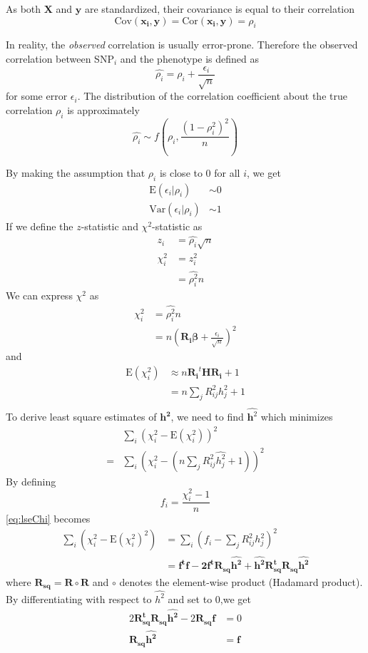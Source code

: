 \documentclass[12pt]{scrbook}
\begin{document}
As both $\boldsymbol{X}$ and $\boldsymbol{y}$ are standardized, their covariance is equal to their correlation
$$
\mathrm{Cov}(\boldsymbol{x_i},\boldsymbol{y})=\mathrm{Cor}(\boldsymbol{x_i},\boldsymbol{y})=\rho_i
$$

In reality, the \emph{observed} correlation is usually error-prone. 
Therefore the observed correlation between SNP$_i$ and the phenotype is defined as 
$$
\hat{\rho_i} = \rho_i+\frac{\epsilon_i}{\sqrt{n}}
$$
for some error $\epsilon_i$. 
The distribution of the correlation coefficient about the true correlation $\rho_i$ is approximately
$$
\hat{\rho_i}\sim f\left(\rho_i, \frac{(1-\rho_i^2)^2}{n}\right)
$$

By making the assumption that $\rho_i$ is close to 0 for all $i$, we get
\begin{align}
\mathrm{E}(\epsilon_i|\rho_i)&\sim 0\\
\mathrm{Var}(\epsilon_i|\rho_i)&\sim 1
\label{eq:assump}
\end{align}
If we define the $z$-statistic and $\chi^2$-statistic as
\begin{align}
z_i&=\hat{\rho_i}\sqrt{n}\\
\chi_i^2&=z_i^2\nonumber\\
&=\hat{\rho_i^2}n
\end{align}
We can express $\chi^2$ as 
\begin{align}
\chi_i^2&=\hat{\rho_i^2}n\nonumber\\
&=n\left(\boldsymbol{R_{i}\beta}+\frac{\epsilon_i}{\sqrt{n}}\right)^2
\end{align}
and
\begin{align}
\mathrm{E}(\chi_i^2)&\approx n\boldsymbol{R_i}^t\boldsymbol{H}\boldsymbol{R_i}+1\nonumber\\
&=n\sum_jR_{ij}^2h_j^2+1\\
\end{align}
To derive least square estimates of $\boldsymbol{h^2}$, we need to find $\hat{\boldsymbol{h}^2}$ which minimizes
\begin{align}
&\sum_i\left(\chi_i^2-\mathrm{E}\left(\chi_i^2\right)\right)^2\nonumber\\
=&\sum_i\left(\chi_i^2-\left(n\sum_jR_{ij}^2\hat{h^2_j}+1\right)\right)^2
\label{eq:lseChi}
\end{align}
By defining 
\begin{equation}
f_i=\frac{\chi_i^2-1}{n}
\label{eq:defineF}
\end{equation}
\cref{eq:lseChi} becomes
\begin{align}
\sum_i\left(\chi_i^2-\mathrm{E}\left(\chi_i^2\right)^2\right)&=\sum_i\left(f_i-\sum_jR_{ij}^2h_j^2\right)^2\\
&=\boldsymbol{f^tf-2f^tR_{sq}\hat{h^2}+\hat{h^2}R^t_{sq}R_{sq}\hat{h^2}}
\end{align}
where $\boldsymbol{R_{sq}=R\circ R}$ and $\circ$ denotes the element-wise product (Hadamard product). By differentiating with respect to $\hat{h^2}$ and set to 0,we get
\begin{align}
2\boldsymbol{R_{sq}^t}\boldsymbol{R_{sq}}\boldsymbol{\hat{h^2}}-2\boldsymbol{R_{sq}f}&=0\nonumber\\
\boldsymbol{R_{sq}\hat{h^2}}&=\boldsymbol{f}
\label{eq:shrekEq}
\end{align}
\end{document}
